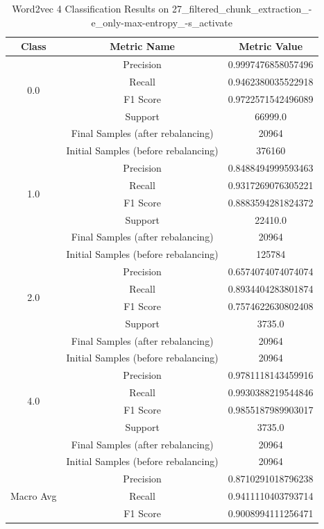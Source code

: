 \begin{longtable}{|c|c|c|}
\caption{Word2vec 4 Classification Results on 27\_filtered\_chunk\_extraction\_-e\_only-max-entropy\_-s\_activate} \label{tab:27_filtered_chunk_extraction_-e_only-max-entropy_-s_activate_word2vec_4_classifiers_results} \\
\hline
Class & Metric Name & Metric Value \\
\hline
\multirow{4}{*}{0.0} & Precision & 0.9997476858057496 \\
 & Recall & 0.9462380035522918 \\
 & F1 Score & 0.9722571542496089 \\
 & Support & 66999.0 \\
 & Final Samples (after rebalancing) & 20964 \\
 & Initial Samples (before rebalancing) & 376160 \\
\hline
\multirow{4}{*}{1.0} & Precision & 0.8488494999593463 \\
 & Recall & 0.9317269076305221 \\
 & F1 Score & 0.8883594281824372 \\
 & Support & 22410.0 \\
 & Final Samples (after rebalancing) & 20964 \\
 & Initial Samples (before rebalancing) & 125784 \\
\hline
\multirow{4}{*}{2.0} & Precision & 0.6574074074074074 \\
 & Recall & 0.8934404283801874 \\
 & F1 Score & 0.7574622630802408 \\
 & Support & 3735.0 \\
 & Final Samples (after rebalancing) & 20964 \\
 & Initial Samples (before rebalancing) & 20964 \\
\hline
\multirow{4}{*}{4.0} & Precision & 0.9781118143459916 \\
 & Recall & 0.9930388219544846 \\
 & F1 Score & 0.9855187989903017 \\
 & Support & 3735.0 \\
 & Final Samples (after rebalancing) & 20964 \\
 & Initial Samples (before rebalancing) & 20964 \\
\hline
\multirow{4}{*}{Macro Avg} & Precision & 0.8710291018796238 \\
 & Recall & 0.9411110403793714 \\
 & F1 Score & 0.9008994111256471 \\

\end{longtable}
